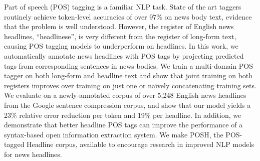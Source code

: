 Part of speech (POS) tagging is a familiar NLP task. State of the art taggers routinely achieve token-level accuracies of over 97\% on news body text, evidence that the problem is well understood. However, the register of English news headlines, ``headlinese'', is very different from the register of long-form text, causing POS tagging models to underperform on headlines. In this work, we automatically annotate news headlines with POS tags by projecting predicted tags from corresponding sentences in news bodies. We train a multi-domain POS tagger on both long-form and headline text and show that joint training on both registers improves over training on just one or naïvely concatenating training sets. We evaluate on a newly-annotated corpus of over 5,248 English news headlines from the Google sentence compression corpus, and show that our model yields a 23\% relative error reduction per token and 19\% per headline. In addition, we demonstrate that better headline POS tags can improve the performance of a syntax-based open information extraction system. We make POSH, the POS-tagged Headline corpus, available to encourage research in improved NLP models for news headlines.
